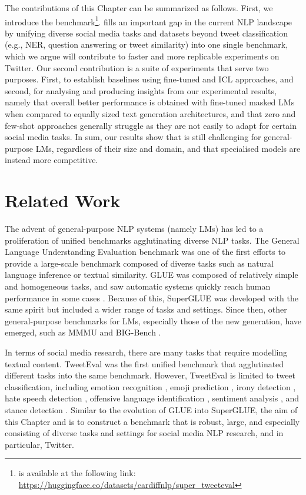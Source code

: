 The contributions of this Chapter can be summarized as follows. First, we introduce the {\DATASET} benchmark\footnote{{\DATASET} is available at the following link: \url{https://huggingface.co/datasets/cardiffnlp/super_tweeteval}}. {\DATASET} fills an important gap in the current NLP landscape by unifying diverse social media tasks and datasets beyond tweet classification (e.g., NER, question answering or tweet similarity) into one single benchmark, which we argue will contribute to faster and more replicable experiments on Twitter. Our second contribution is a suite of experiments that serve two purposes. First, to establish baselines using fine-tuned and ICL approaches, and second, for analysing and producing insights from our experimental results, namely that overall better performance is obtained with fine-tuned masked \acp{LM} when compared to equally sized text generation architectures, and that zero and few-shot approaches generally struggle as they are not easily to adapt for certain social media tasks. 
In sum, our results show that {\DATASET} is still challenging for general-purpose \acp{LM}, regardless of their size and domain, and that specialised models are instead  more competitive. 

\section{Related Work}
The advent of general-purpose NLP systems (namely LMs) has led to a proliferation of unified benchmarks agglutinating diverse NLP tasks. The General Language Understanding Evaluation benchmark \cite[GLUE]{wang-etal-2018-glue} was one of the first efforts to provide a large-scale benchmark composed of diverse tasks such as natural language inference or textual similarity. GLUE was composed of relatively simple and homogeneous tasks, and saw automatic systems quickly reach human performance in some cases \cite{XLNet}. Because of this, SuperGLUE \cite{wang2019superglue} was developed with the same spirit but included a wider range of tasks and settings. Since then, other general-purpose benchmarks for \acp{LM}, especially those of the new generation, have emerged, such as MMMU \cite{hendryckstest2021} and BIG-Bench \cite{srivastava2022beyond}.

In terms of social media research, there are many tasks that require modelling textual content. TweetEval \cite{barbieri2020tweeteval} was the first unified benchmark that agglutinated different tasks into the same benchmark. However, TweetEval is limited to tweet classification, including emotion recognition \cite{mohammad2018semeval}, emoji prediction \cite{barbieri-etal-2018-semeval}, irony detection \cite{van2018semeval}, hate speech detection \cite{basile2019semeval},  offensive language identification \cite{zampieri-etal-2019-semeval}, sentiment analysis \cite{rosenthal2017semeval}, and stance detection \cite{mohammad-etal-2016-semeval}. Similar to the evolution of GLUE into SuperGLUE, the aim of this Chapter and {\DATASET} is to construct a benchmark that is robust, large, and especially consisting of diverse tasks and settings for social media NLP research, and in particular, Twitter.


